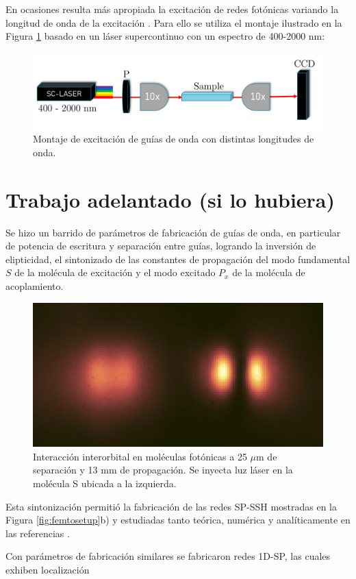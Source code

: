 \documentclass{article}
\begin{document}
En ocasiones resulta más apropiada la excitación de redes fotónicas variando la longitud de onda de la excitación \cite{spectraltransfer, SPSSH}. Para ello se utiliza el montaje ilustrado en la Figura \ref{fig:supercontinuum} basado en un láser supercontinuo con un espectro de 400-2000 nm:

\begin{figure}[H]
	\centering
	\includegraphics[width=0.6\linewidth]{./media/supercontinuum.png}
	\caption{Montaje de excitación de guías de onda con distintas longitudes de onda.\label{fig:supercontinuum}}
\end{figure}


\section{Trabajo adelantado (si lo hubiera)}

Se hizo un barrido de parámetros de fabricación de guías de onda, en particular de potencia de escritura y separación entre guías, logrando la inversión de elipticidad, el sintonizado de las constantes de propagación del modo fundamental $S$ de la molécula de excitación y el modo excitado $P_x$ de la molécula de acoplamiento.


\begin{figure}[H]
	\centering
	\includegraphics[width=0.5\linewidth]{./media/SPinteraction.png}
	\caption{Interacción interorbital en moléculas fotónicas a 25 $\mu$m de separación y 13 mm de propagación. Se inyecta luz láser en la molécula S ubicada a la izquierda.}
\end{figure}

Esta sintonización permitió la fabricación de las redes SP-SSH mostradas en la Figura \ref{fig:femtosetup}b) y estudiadas tanto teórica, numérica y analíticamente en las referencias \cite{toporusos, topo1dphoto, SPSSH}.

Con parámetros de fabricación similares se fabricaron redes 1D-SP, las cuales exhiben localización 
\end{document}

